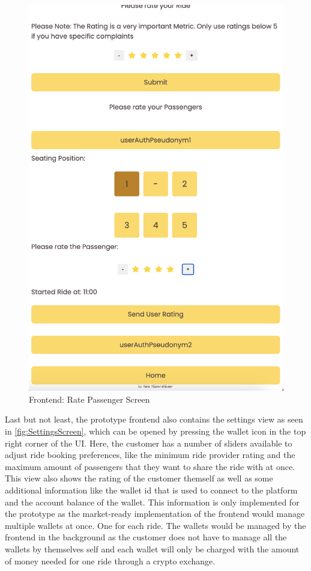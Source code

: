 \begin{figure}[H]
\begin{minipage}{0.45\linewidth}
        \includegraphics[width=\linewidth]{data/ffss/12.png}
        \caption{Frontend: Rate Passenger Screen}
        \label{fig:RatePassengerScreen}
    \end{minipage}
    
\end{figure}

Last but not least, the prototype frontend  also contains the settings view as seen in \ref{fig:SettingsScreen}, which can be opened by pressing the wallet icon in the top right corner of the UI. Here, the customer has a number of sliders available to adjust ride booking preferences, like the minimum ride provider rating and the maximum amount of passengers that they want to share the ride with at once. This view also shows the rating of the customer themself as well as some additional information like the wallet id that is used to connect to the platform and the account balance of the wallet. This information is only implemented for the prototype as the market-ready implementation of the frontend would manage multiple wallets at once. One for each ride. The wallets would be managed by the frontend in the background as the customer does not have to manage all the wallets by themselves self and each wallet will only be charged with the amount of money needed for one ride through a crypto exchange.

